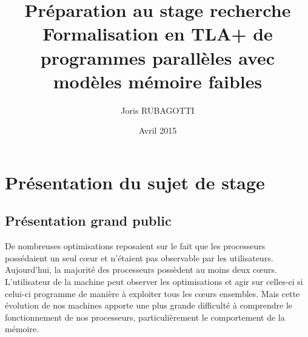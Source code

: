 \documentclass[12pt,a4paper]{article}
\title{Préparation au stage recherche \\ Formalisation en TLA+ de programmes parallèles avec\\ modèles mémoire faibles}
\author{Joris RUBAGOTTI}
\date{Avril 2015}
\begin{document}
\maketitle

\section{Présentation du sujet de stage}

\subsection{Présentation grand public}

De nombreuses optimisations reposaient sur le fait que les processeurs possédaient un seul cœur et n'étaient pas observable par les utilisateurs. Aujourd'hui, la majorité des processeurs possèdent au moins deux cœurs. L'utilisateur de la machine peut observer les optimisations et agir sur celles-ci si celui-ci programme de manière à exploiter tous les cœurs ensembles. Mais cette évolution de nos machines apporte une plus grande difficulté à comprendre le fonctionnement de nos processeurs, particulièrement le comportement de la mémoire.
\end{document}
